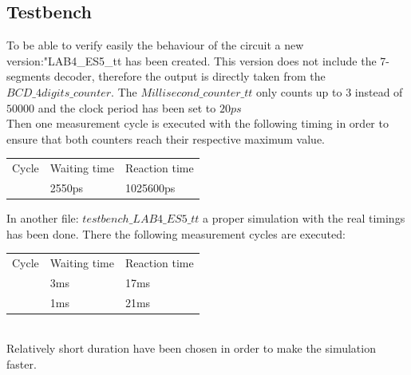 \documentclass[12pt]{article}
\begin{document}
\subsection{Testbench}
To be able to verify easily the behaviour of the circuit a new version:"LAB4\_ES5\_tt has been created. This version does not include the 7-segments decoder, therefore the output is directly taken from the $BCD\_4digits\_counter$. The $Millisecond\_counter\_tt$ only counts up to $3$ instead of $50000$ and the clock period has been set to $20ps$\\
Then one measurement cycle is executed with the following timing  in order to ensure that both counters reach their respective maximum value.

	\begin{tabular}{lll}
	Cycle & Waiting time & Reaction time \\
	& 2550ps          & 1025600ps                  
\end{tabular}


In another file: $testbench\_LAB4\_ES5\_tt$ a proper simulation with the real timings has been done. There the following measurement cycles are executed:

	\begin{tabular}{lll}
		Cycle & Waiting time & Reaction time \\
		& 3ms          & 17ms          \\
		& 1ms          & 21ms         
	\end{tabular}
\\

Relatively short duration have been chosen in order to make the simulation faster.
\end{document}
